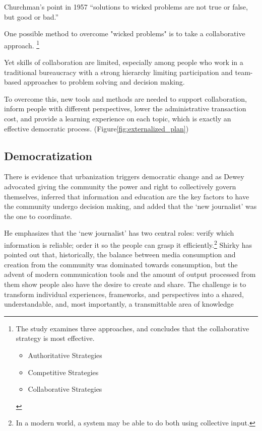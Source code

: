  Churchman's point in 1957 ``solutions to wicked problems are not true or false, but good or bad.''

One possible method to overcome "wicked problems" is to take
a collaborative approach. \cite{roberts2000wicked}
\footnote{The study examines three approaches, and concludes that the collaborative strategy is most effective.
  \begin{itemize}
\item Authoritative Strategies
\item Competitive Strategies
\item Collaborative Strategies
  \end{itemize}
}

Yet skills of collaboration are limited, especially among people who work in a traditional bureaucracy with a strong hierarchy limiting participation and team-based approaches to problem solving and decision making.

To overcome this, new tools and methods are needed to support collaboration, inform people with different perspectives, lower the administrative transaction cost, and provide a learning experience on each topic, which is exactly an effective democratic process. (Figure\ref{fig:externalized_plan})

\subsection{Democratization}

There is evidence that urbanization triggers democratic change\cite{woolley2010evidence} and as  Dewey advocated giving the community the power and right to collectively govern themselves, inferred that information and education are the key factors to have the community undergo decision making, and added that the `new journalist' was the one to coordinate. \cite{dewey2012public} 

He emphasizes that the `new journalist' has two central roles: verify which information is reliable; order it so the people can grasp
it efficiently.\footnote{In a modern world, a system may be able to do both using collective input.}
Shirky has pointed out that, historically, the balance between media consumption and creation from the community was dominated towards consumption, but the advent of modern communication tools and the amount of output processed from them show people also have the desire to create and share\cite{shirky2008here}.  The challenge is to transform individual experiences, frameworks, and perspectives into a shared, understandable, and, most importantly, a transmittable area of knowledge


